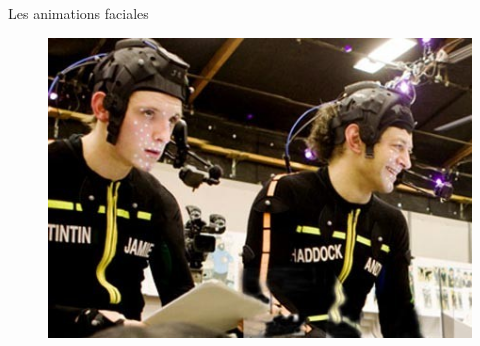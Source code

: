 \documentclass[compress,pdf,11pt,xcolor=dvipsnames]{beamer}
\begin{document}
\begin{frame}{Les animations faciales}
\begin{figure}
\begin{columns}
\begin{column}{0.5\textwidth}
      \includegraphics[width=\textwidth]{img/Making-of-Tintin-Spielberg_scaledown_450}
    \end{column}
  \end{columns}
  
\end{figure}


      
      
  \end{frame}
\end{document}
